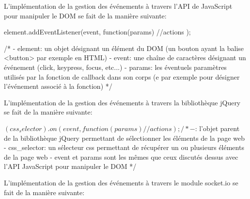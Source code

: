 \documentclass[12pt]{report}
\begin{document}
		L'implémentation de la gestion des événements à travers l'API de JavaScript pour manipuler le DOM se fait de la manière suivante:

		\begin{verbatimtab}[4]
			element.addEventListener(event, function(params){
				//actions
			});

			/*
				- element: un objet désignant un élément du DOM
				(un bouton ayant la balise <button> par exemple en HTML)
				- event: une chaîne de caractères désignant un événement
				(click, keypress, focus, etc...)
				- params: les éventuels paramètres utilisés par la fonction
				de callback dans son corps
				(e par exemple pour désigner l'événement associé à la fonction)
			*/
		\end{verbatimtab}

		L'implémentation de la gestion des événements à travers la bibliothèque jQuery se fait de la manière suivante:

		\begin{verbatimtab}[4]
			$(css_selector).on(event, function(params){
				//actions
			});

			/*
				- $: l'objet parent de la bibliothèque jQuery permettant de
				sélectionner les éléments de la page web
				- css_selector: un sélecteur css permettant de récupérer un
				ou plusieurs éléments de la page web
				- event et params sont les mêmes que ceux discutés
				dessus avec l'API JavaScript pour manipuler le DOM
			*/
		\end{verbatimtab}

		L'implémentation de la gestion des événements à travers le module socket.io se fait de la manière suivante:
\end{document}
